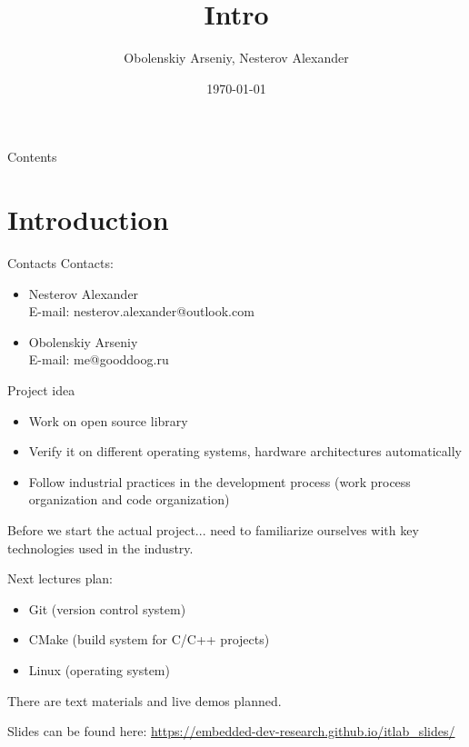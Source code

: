 \documentclass{beamer}
\title[Introduction]{Intro}
\author{Obolenskiy Arseniy, Nesterov Alexander}
\institute{ITLab}
\date{\today}
\begin{document}
\begin{frame}
    \titlepage
\end{frame}

\begin{frame}{Contents}
    \tableofcontents
\end{frame}

\section{Introduction}

\begin{frame}{Contacts}
  Contacts:
  \begin{itemize}
    \item Nesterov Alexander \\
      E-mail: nesterov.alexander@outlook.com
    \item Obolenskiy Arseniy \\
      E-mail: me@gooddoog.ru
  \end{itemize}
\end{frame}


\begin{frame}{Project idea}
  \begin{itemize}
    \item Work on open source library
    \item Verify it on different operating systems, hardware architectures automatically
    \item Follow industrial practices in the development process (work process organization and code organization)
  \end{itemize}
\end{frame}

\begin{frame}{Before we start the actual project...}
  need to familiarize ourselves with key technologies used in the industry.

  Next lectures plan:
  \begin{itemize}
    \item Git (version control system)
    \item CMake (build system for C/C++ projects)
    \item Linux (operating system)
  \end{itemize}

  There are text materials and live demos planned.

  Slides can be found here: \href{https://embedded-dev-research.github.io/itlab_slides/}{https://embedded-dev-research.github.io/itlab\_slides/}
\end{frame}
\end{document}
